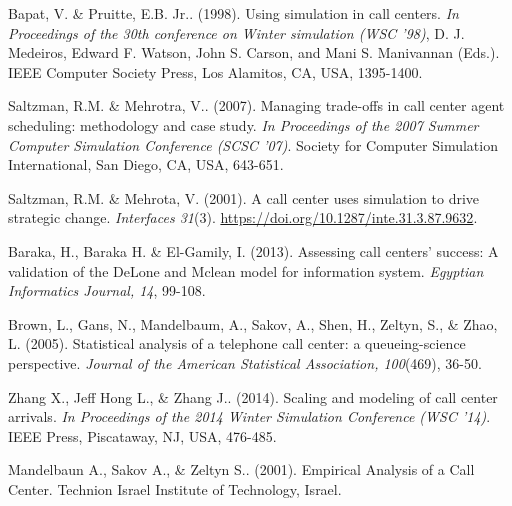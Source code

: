 \documentclass[12pt,twocolumn]{article}
\begin{document}
\newpage
\clearpage
{}
\begin{thebibliography}{7}
	
	Bapat, V. \& Pruitte, E.B. Jr.. (1998). Using simulation in call centers. \textit{In Proceedings of the 30th conference on Winter simulation (WSC '98)}, D. J. Medeiros, Edward F. Watson, John S. Carson, and Mani S. Manivannan (Eds.). IEEE Computer Society Press, Los Alamitos, CA, USA, 1395-1400.
	
	Saltzman, R.M. \& Mehrotra, V.. (2007). Managing trade-offs in call center agent scheduling: methodology and case study. \textit{In Proceedings of the 2007 Summer Computer Simulation Conference (SCSC '07)}. Society for Computer Simulation International, San Diego, CA, USA, 643-651.
	
	Saltzman, R.M. \& Mehrota, V. (2001). A call center uses simulation to drive strategic change. \textit{Interfaces 31}(3). \href{https://doi.org/10.1287/inte.31.3.87.9632}{https://doi.org/10.1287/inte.31.3.87.9632}. 
	
	
	Baraka, H., Baraka H. \& El-Gamily, I. (2013). Assessing call centers' success: A validation of the DeLone and Mclean model for information system. \textit{Egyptian Informatics Journal, 14}, 99-108.

	Brown, L., Gans, N., Mandelbaum, A., Sakov, A., Shen, H., Zeltyn, S., \& Zhao, L. (2005). Statistical analysis of a telephone call center: a queueing-science perspective. \textit{Journal of the American Statistical Association, 100}(469), 36-50.

	Zhang X., Jeff Hong L., \& Zhang J.. (2014). Scaling and modeling of call center arrivals. \textit{In Proceedings of the 2014 Winter Simulation Conference (WSC '14)}. IEEE Press, Piscataway, NJ, USA, 476-485.

	Mandelbaun A., Sakov A., \& Zeltyn S.. (2001). Empirical Analysis of a Call Center. Technion Israel Institute of Technology, Israel.

\end{thebibliography}
\end{document}
